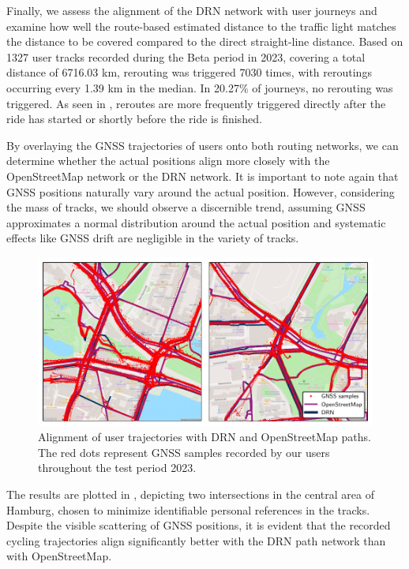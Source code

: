 Finally, we assess the alignment of the DRN network with user journeys and examine how well the route-based estimated distance to the traffic light matches the distance to be covered compared to the direct straight-line distance. Based on 1327 user tracks recorded during the Beta period in 2023, covering a total distance of 6716.03 km, rerouting was triggered 7030 times, with reroutings occurring every 1.39 km in the median. In 20.27\% of journeys, no rerouting was triggered. As seen in , reroutes are more frequently triggered directly after the ride has started or shortly before the ride is finished. 

By overlaying the GNSS trajectories of users onto both routing networks, we can determine whether the actual positions align more closely with the OpenStreetMap network or the DRN network. It is important to note again that GNSS positions naturally vary around the actual position. However, considering the mass of tracks, we should observe a discernible trend, assuming GNSS approximates a normal distribution around the actual position and systematic effects like GNSS drift are negligible in the variety of tracks.

\begin{figure}[t]
\centering 
\includegraphics[width=\linewidth]{images/routing-mapmatching-distance.pdf}
\caption{Alignment of user trajectories with DRN and OpenStreetMap paths. The red dots represent GNSS samples recorded by our users throughout the test period 2023.}
\label{fig:routing-mapmatching-distance}
\end{figure}

The results are plotted in , depicting two intersections in the central area of Hamburg, chosen to minimize identifiable personal references in the tracks. Despite the visible scattering of GNSS positions, it is evident that the recorded cycling trajectories align significantly better with the DRN path network than with OpenStreetMap.

